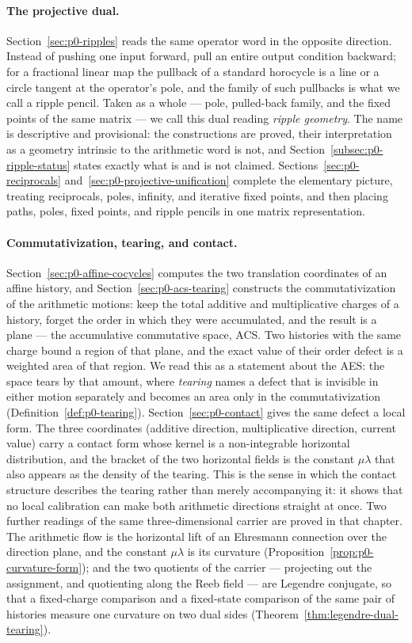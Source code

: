 \paragraph{The projective dual.}
Section~\ref{sec:p0-ripples} reads the same operator word in the opposite
direction.  Instead of pushing one input forward, pull an entire output
condition backward; for a fractional linear map the pullback of a standard
horocycle is a line or a circle tangent at the operator's pole, and the family
of such pullbacks is what we call a ripple pencil.  Taken as a whole --- pole,
pulled-back family, and the fixed points of the same matrix --- we call this
dual reading \emph{ripple geometry}.  The name is descriptive and provisional:
the constructions are proved, their interpretation as a geometry intrinsic to
the arithmetic word is not, and Section~\ref{subsec:p0-ripple-status} states
exactly what is and is not claimed.
Sections~\ref{sec:p0-reciprocals} and~\ref{sec:p0-projective-unification}
complete the elementary picture, treating reciprocals, poles, infinity, and
iterative fixed points, and then placing paths, poles, fixed points, and ripple
pencils in one matrix representation.

\paragraph{Commutativization, tearing, and contact.}
Section~\ref{sec:p0-affine-cocycles} computes the two translation coordinates of
an affine history, and Section~\ref{sec:p0-acs-tearing} constructs the
commutativization of the arithmetic motions: keep the total additive and
multiplicative charges of a history, forget the order in which they were
accumulated, and the result is a plane --- the accumulative commutative space,
ACS.  Two histories with the same charge bound a region of that plane, and the
exact value of their order defect is a weighted area of that region.  We read
this as a statement about the AES: the space tears by that amount, where
\emph{tearing} names a defect that is invisible in either motion separately and
becomes an area only in the commutativization (Definition~\ref{def:p0-tearing}).
Section~\ref{sec:p0-contact} gives the same defect a local form.  The three
coordinates (additive direction, multiplicative direction, current value) carry
a contact form whose kernel is a non-integrable horizontal distribution, and the
bracket of the two horizontal fields is the constant $\mu\lambda$ that also
appears as the density of the tearing.  This is the sense in which the contact
structure describes the tearing rather than merely accompanying it: it shows
that no local calibration can make both arithmetic directions straight at once.
Two further readings of the same three-dimensional carrier are proved in that
chapter.  The arithmetic flow is the horizontal lift of an Ehresmann connection
over the direction plane, and the constant $\mu\lambda$ is its curvature
(Proposition~\ref{prop:p0-curvature-form}); and the two quotients of the carrier
--- projecting out the assignment, and quotienting along the Reeb field --- are
Legendre conjugate, so that a fixed-charge comparison and a fixed-state
comparison of the same pair of histories measure one curvature on two dual
sides (Theorem~\ref{thm:legendre-dual-tearing}).

